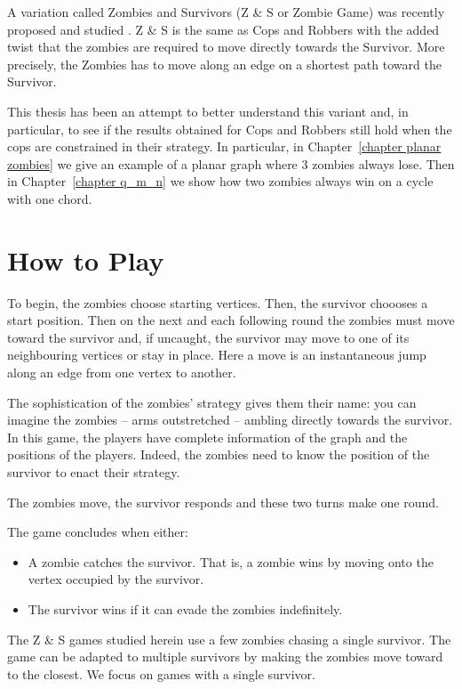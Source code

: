 A variation called Zombies and Survivors (Z \& S or Zombie Game) was recently proposed and studied  \cite{fitzpatrick2016deterministic, fitzpatrick2018game}.
Z \& S is the same as Cops and Robbers with the added twist that the zombies are required to move directly towards the Survivor. More precisely, the Zombies has to move along an edge
on a shortest path toward the Survivor.

This thesis has been an attempt to better understand this variant and, in particular,
to see if the results obtained for Cops and Robbers still hold when the cops
are constrained in their strategy. In particular, in Chapter~\ref{chapter planar zombies}
we give an example of a planar graph where 3 zombies always lose.
Then in Chapter~\ref{chapter q_m_n} we show how two zombies always win on a cycle with one chord.

\section{How to Play}

To begin, the zombies choose starting vertices.
Then, the survivor choooses a start position.
Then on the next and each following round the zombies must move toward the survivor
and, if uncaught, the survivor may move to one of its neighbouring vertices or stay in place.
 Here a move is an instantaneous jump along an edge from one vertex to another.

The sophistication of the zombies' strategy gives them their name:
you can imagine the zombies -- arms outstretched -- ambling directly towards the survivor.
In this game, the players have complete information of the graph and the positions of the players. Indeed, the zombies need to know the position of the survivor to enact
their strategy.

The zombies move, the survivor responds and these two turns make one round.

The game concludes when either:
\begin{itemize}
\item A zombie catches the survivor. That is, a zombie wins by moving onto the vertex
occupied by the survivor.
\item The survivor wins if it can evade the zombies indefinitely.
\end{itemize}


The Z \& S games studied herein use a few zombies chasing a single survivor. The game
can be adapted to multiple survivors by making the zombies move toward
to the closest. We focus on games with a single survivor.

